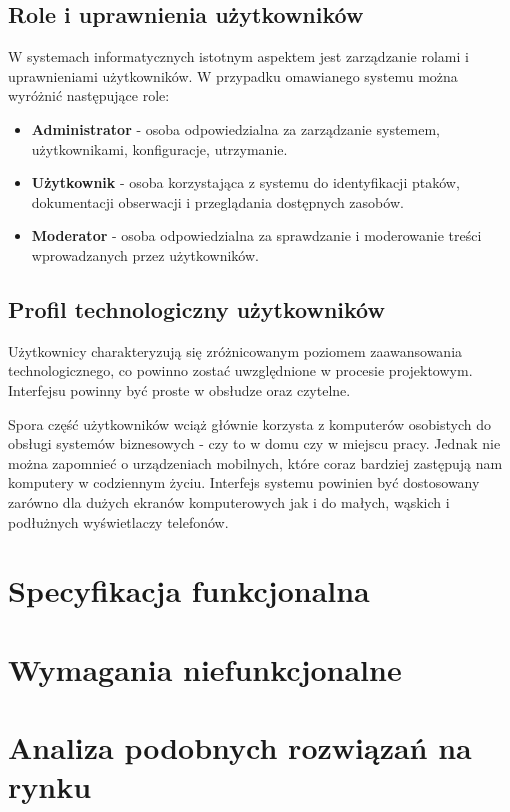 \subsection{Role i uprawnienia użytkowników}

W systemach informatycznych istotnym aspektem jest zarządzanie rolami i uprawnieniami użytkowników. W przypadku omawianego systemu można wyróżnić następujące role:
\begin{itemize}
	\item \textbf{Administrator} - osoba odpowiedzialna za zarządzanie systemem, użytkownikami, konfiguracje, utrzymanie.
	\item \textbf{Użytkownik} - osoba korzystająca z systemu do identyfikacji ptaków, dokumentacji obserwacji i przeglądania dostępnych zasobów.
	\item \textbf{Moderator} - osoba odpowiedzialna za sprawdzanie i moderowanie treści wprowadzanych przez użytkowników.
\end{itemize}

\subsection{Profil technologiczny użytkowników}

Użytkownicy charakteryzują się zróżnicowanym poziomem zaawansowania technologicznego, co powinno zostać uwzględnione w procesie projektowym. Interfejsu powinny być proste w obsłudze oraz czytelne.

Spora część użytkowników wciąż głównie korzysta z komputerów osobistych do obsługi systemów biznesowych - czy to w domu czy w miejscu pracy. Jednak nie można zapomnieć o urządzeniach mobilnych, które coraz bardziej zastępują nam komputery w codziennym życiu. Interfejs systemu powinien być dostosowany zarówno dla dużych ekranów komputerowych jak i do małych, wąskich i podłużnych wyświetlaczy telefonów.

\section{Specyfikacja funkcjonalna}

\section{Wymagania niefunkcjonalne}

\section{Analiza podobnych rozwiązań na rynku}
